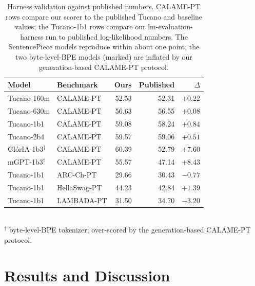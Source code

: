 \documentclass[11pt]{article}
\begin{document}
\begin{table}[t]
\centering
\caption{Harness validation against published numbers. CALAME-PT rows compare our
scorer to the published Tucano and baseline values; the Tucano-1b1 rows compare our
lm-evaluation-harness run to published log-likelihood numbers. The SentencePiece models
reproduce within about one point; the two byte-level-BPE models (marked) are inflated by
our generation-based CALAME-PT protocol.}
\label{tab:valid}
\small
\begin{tabular}{llrrr}
\toprule
Model & Benchmark & Ours & Published & $\Delta$ \\
\midrule
Tucano-160m  & CALAME-PT     & 52.53 & 52.31 & $+0.22$ \\
Tucano-630m  & CALAME-PT     & 56.63 & 56.55 & $+0.08$ \\
Tucano-1b1   & CALAME-PT     & 59.08 & 58.24 & $+0.84$ \\
Tucano-2b4   & CALAME-PT     & 59.57 & 59.06 & $+0.51$ \\
Gl\'orIA-1b3$^{\dagger}$ & CALAME-PT & 60.39 & 52.79 & $+7.60$ \\
mGPT-1b3$^{\dagger}$     & CALAME-PT & 55.57 & 47.14 & $+8.43$ \\
\midrule
Tucano-1b1   & ARC-Ch-PT     & 29.66 & 30.43 & $-0.77$ \\
Tucano-1b1   & HellaSwag-PT  & 44.23 & 42.84 & $+1.39$ \\
Tucano-1b1   & LAMBADA-PT    & 31.50 & 34.70 & $-3.20$ \\
\bottomrule
\end{tabular}
\\[2pt]
{\footnotesize $^{\dagger}$ byte-level-BPE tokenizer; over-scored by the
generation-based CALAME-PT protocol.}
\end{table}

\section{Results and Discussion}
\end{document}
